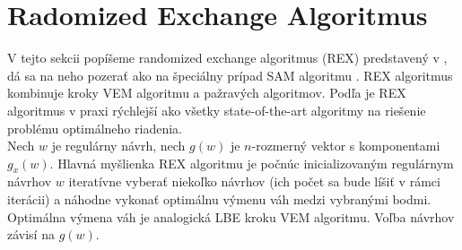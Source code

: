 \section {Radomized Exchange Algoritmus}

V tejto sekcii popíšeme randomized exchange algoritmus (REX) predstavený v \cite{rex_harman}, dá sa na neho pozerať ako na špeciálny prípad SAM algoritmu \cite{rex_harman}. REX algoritmus kombinuje kroky VEM algoritmu a pažravých algoritmov. Podľa \cite{rex_harman} je REX algoritmus v praxi rýchlejší ako všetky state-of-the-art algoritmy na riešenie problému optimálneho riadenia.\\

Nech $w$ je regulárny návrh, nech $g(w)$ je $n$-rozmerný vektor s komponentami $g_x(w)$. Hlavná myšlienka REX algoritmu je počnúc inicializovaným regulárnym návrhov $w$ iteratívne vyberať niekoľko návrhov (ich počet sa bude líšiť v rámci iterácii) a náhodne vykonať optimálnu výmenu váh medzi vybranými bodmi. Optimálna výmena váh je analogická LBE kroku VEM algoritmu. Voľba návrhov závisí na $g(w)$.


